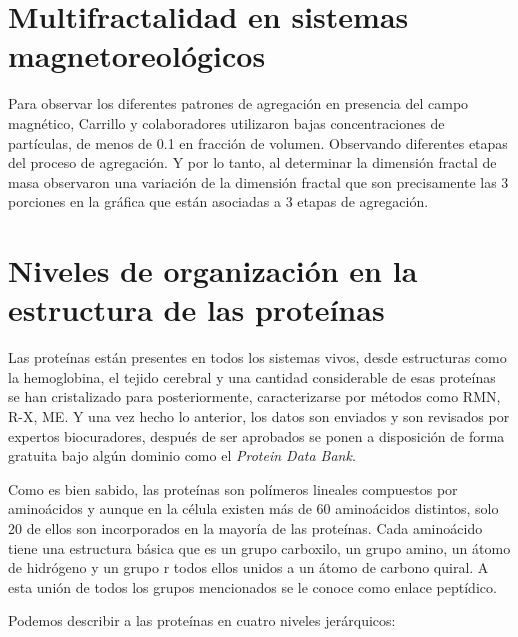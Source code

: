 \section{Multifractalidad en sistemas magnetoreol\'{o}gicos}

Para observar los diferentes patrones de agregaci\'{o}n en presencia del campo magn\'{e}tico, Carrillo y colaboradores utilizaron bajas concentraciones de part\'{i}culas, de menos de 0.1 en fracci\'{o}n de volumen. Observando diferentes etapas del proceso de agregaci\'{o}n. Y por lo tanto, al determinar la dimensi\'{o}n fractal de masa observaron una variaci\'{o}n de la dimensi\'{o}n fractal que son precisamente las 3 porciones en la gr\'{a}ﬁca que est\'{a}n asociadas a 3 etapas de agregaci\'{o}n.
 
 
 
\section{Niveles de organizaci\'{o}n en la estructura de las prote\'{i}nas}


Las prote\'{i}nas est\'{a}n presentes en todos los sistemas vivos, desde estructuras como la hemoglobina, el tejido cerebral y una cantidad considerable de esas prote\'{i}nas se han cristalizado para
posteriormente, caracterizarse por m\'{e}todos como RMN, R-X, ME. Y una vez hecho lo anterior, los datos son enviados y son revisados por expertos biocuradores, despu\'{e}s de
ser aprobados se ponen a disposici\'{o}n de forma gratuita bajo algún dominio como el \textit{Protein Data Bank}.


Como es bien sabido, las prote\'{i}nas son pol\'{i}meros lineales compuestos por amino\'{a}cidos y aunque en la
c\'{e}lula existen m\'{a}s de 60 amino\'{a}cidos distintos, solo 20 de ellos son incorporados en la mayor\'{i}a de las
prote\'{i}nas.
Cada amino\'{a}cido tiene una estructura b\'{a}sica que es un grupo carboxilo, un grupo amino, un \'{a}tomo de
hidr\'{o}geno y un grupo r todos ellos unidos a un \'{a}tomo de carbono quiral. A esta uni\'{o}n de todos los grupos
mencionados se le conoce como enlace pept\'{i}dico.

Podemos describir a las prote\'{i}nas en cuatro niveles jer\'{a}rquicos:

